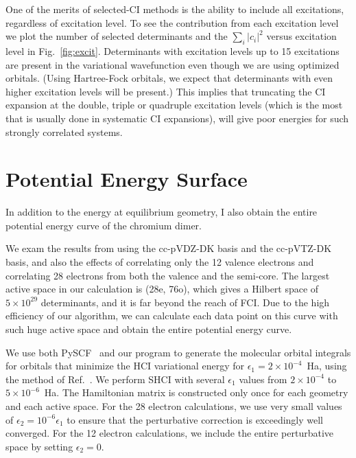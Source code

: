 One of the merits of selected-CI methods is the ability to include all excitations, regardless of excitation level.
To see the contribution from each excitation level we plot the number of selected determinants and the $\sum_i \left|c_i\right|^2$ versus excitation level in Fig.~\ref{fig:excit}.
Determinants with excitation levels up to 15 excitations are present in the variational wavefunction even though we are using optimized orbitals.
(Using Hartree-Fock orbitals, we expect that determinants with even higher excitation levels will be present.)
This implies that truncating the CI expansion at the double, triple or quadruple excitation levels (which is the most that is usually done in systematic
CI expansions), will give poor energies for such strongly correlated systems.

\section{Potential Energy Surface}
In addition to the energy at equilibrium geometry, I also obtain the entire potential energy curve of the chromium dimer.

We exam the results from using the cc-pVDZ-DK basis and the cc-pVTZ-DK basis, and also the effects of correlating only the 12 valence electrons and correlating 28 electrons from both the valence and the semi-core.
The largest active space in our calculation is (28e, 76o), which gives a Hilbert space of $5\times10^{29}$ determinants, and it is far beyond the reach of FCI.
Due to the high efficiency of our algorithm, we can calculate each data point on this curve with such huge active space and obtain the entire potential energy curve.

We use both PySCF~\cite{SunCha_etal_PySCF-ComMolSci-18} and our program to generate the molecular orbital integrals for orbitals that minimize the HCI variational
energy for $\epsilon_1=2\times 10^{-4}$~Ha, using the method of Ref.~\cite{SmiMusHolSha-JCTC-17}.
We perform SHCI with several $\epsilon_1$ values from $2\times10^{-4}$ to $5\times10^{-6}$~Ha.
The Hamiltonian matrix is constructed only once for each geometry and each active space.
For the 28 electron calculations, we use very small values of $\epsilon_2 = 10^{-6} \epsilon_1$  to ensure that the perturbative correction is exceedingly well converged.
For the 12 electron calculations, we include the entire perturbative space by setting $\epsilon_2=0$.

